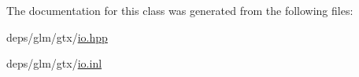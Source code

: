 The documentation for this class was generated from the following files\+:\begin{DoxyCompactItemize}
\item 
deps/glm/gtx/\hyperlink{io_8hpp}{io.\+hpp}\item 
deps/glm/gtx/\hyperlink{io_8inl}{io.\+inl}\end{DoxyCompactItemize}
